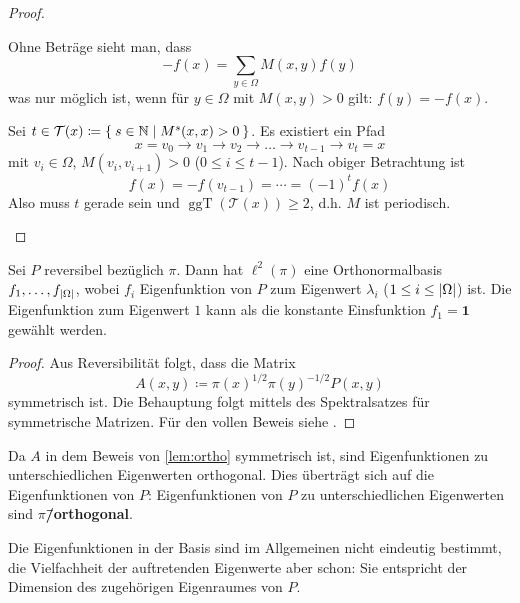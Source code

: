 \documentclass[ngerman,a4paper,11pt]{scrartcl}
\newcommand{\NN}{\mathbb{N}}
\DeclarePairedDelimiter{\abs}{\lvert}{\rvert}		%
\DeclareMathOperator{\ggT}{ggT}
\begin{document}
\begin{proof}
\begin{thmlist}
    Ohne Beträge sieht man, dass
    \begin{equation*}
     -f(x)=\sum_{y\in\Omega}M(x,y)f(y)
    \end{equation*}
   was nur möglich ist, wenn für $y\in\Omega$ mit $M(x,y)>0$ gilt: $f(y)=-f(x)$. 
   
   Sei $t\in\mathcal{T}(x)\coloneqq\Set{s\in\NN\mid M^s(x,x)>0}$. Es existiert
   ein Pfad
   \begin{equation*}
     x=v_0\rightarrow v_1\rightarrow v_2\rightarrow\dotso\rightarrow v_{t-1}\rightarrow v_t=x
   \end{equation*}
   mit $v_i\in\Omega$, $M(v_i, v_{i+1})>0$ ($0\leq i\leq t-1$). Nach obiger
   Betrachtung ist 
   \begin{equation*}
    f(x)=-f(v_{t-1})=\dotsb=(-1)^tf(x) 
   \end{equation*}
   Also muss $t$ gerade sein und $\ggT(\mathcal{T}(x))\geq 2$, d.h. $M$ ist
   periodisch.
  \end{thmlist}
\end{proof}

\begin{lem}
 \label{lem:ortho}
 Sei $P$ reversibel bezüglich $\pi$. Dann hat $\ell^2(\pi)$  eine
 Orthonormalbasis $f_1,\dotsc ,f_{\abs{\Omega}}$, wobei $f_i$ Eigenfunktion von
 $P$ zum Eigenwert $\lambda_i$ ($1\leq i\leq\abs{\Omega}$) ist. Die
 Eigenfunktion zum Eigenwert $1$ kann als die konstante Einsfunktion $f_1=\mathbf{1}$ gewählt werden.
\end{lem}
\begin{proof}
 Aus Reversibilität folgt, dass die Matrix
 \begin{equation*}
  A(x,y)\coloneqq\pi(x)^{1/2}\pi(y)^{-1/2}P(x,y) 
 \end{equation*}
 symmetrisch ist. Die Behauptung folgt mittels des Spektralsatzes für
 symmetrische Matrizen. Für den vollen Beweis siehe \cite[Lemma~12.2(i)]{lpw}.
\end{proof}

\begin{rem}
 \label{rem:eigortho}
 \begin{remlist}
 \item Da $A$ in dem Beweis von \cref{lem:ortho} symmetrisch ist, sind Eigenfunktionen
  zu unterschiedlichen Eigenwerten orthogonal. Dies überträgt sich auf die
  Eigenfunktionen von $P$: Eigenfunktionen von $P$ zu unterschiedlichen
  Eigenwerten sind \textbf{$\pi$\=/orthogonal}.
 \item Die Eigenfunktionen in der Basis sind im Allgemeinen nicht eindeutig bestimmt, die
   Vielfachheit der auftretenden Eigenwerte aber schon: Sie entspricht der
   Dimension des zugehörigen Eigenraumes von $P$. \label{rem:eignum}
 \end{remlist}
\end{rem}
\end{document}
